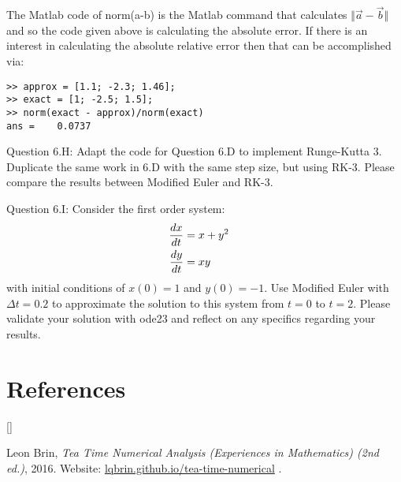 \documentclass{article}
\def\beginrefs{\begin{list}%
        {[\arabic{equation}]}{\usecounter{equation}
         \setlength{\leftmargin}{2.0truecm}\setlength{\labelsep}{0.4truecm}%
         \setlength{\labelwidth}{1.6truecm}}}
\def\endrefs{\end{list}}
\def\bibentry#1{\item[\hbox{[#1]}]}
\def\ds{\displaystyle}
\begin{document}
{\color{teal} The Matlab code of norm(a-b) is the Matlab command that calculates $\ds \Vert \vec a - \vec b \Vert$ and so the code given above is calculating the absolute error. If there is an interest in calculating the absolute relative error then that can be accomplished via:
\begin{verbatim}
>> approx = [1.1; -2.3; 1.46];
>> exact = [1; -2.5; 1.5];
>> norm(exact - approx)/norm(exact)
ans =    0.0737    
\end{verbatim}   }
\par \medskip \noindent 
%
Question 6.H: Adapt the code for Question 6.D to implement Runge-Kutta 3. Duplicate the same work in 6.D with the same step size, but using RK-3. Please compare the results between Modified Euler and RK-3.  
\par \medskip \noindent 
%
Question 6.I: Consider the first order system:
\begin{align*}
    \frac {dx}{dt} &= x+y^2  \cr 
    \frac {dy}{dt} &= xy
\end{align*}
with initial conditions of $x(0)=1$ and $y(0)=-1$. Use Modified Euler with $\Delta t = 0.2$ to approximate the solution to this system from $t=0$ to $t=2$. Please validate your solution with ode23 and reflect on any specifics regarding your results. 
\par \bigskip \par


\section*{References}
\beginrefs


\bibentry{LB16}{\sc Leon Brin},
{\it Tea Time Numerical Analysis (Experiences in Mathematics)  (2nd ed.)}, 2016. Website: \href{http://lqbrin.github.io/tea-time-numerical/}{lqbrin.github.io/tea-time-numerical} .

\endrefs
\end{document}
